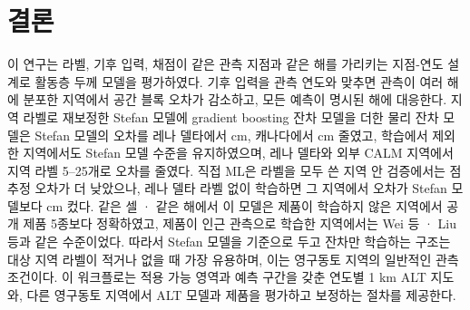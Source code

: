\section{결론}\label{sec:conclusions}
이 연구는 라벨, 기후 입력, 채점이 같은 관측 지점과 같은 해를 가리키는 지점-연도 설계로 활동층 두께 모델을 평가하였다. 기후 입력을 관측 연도와 맞추면 관측이 여러 해에 분포한 지역에서 공간 블록 오차가 감소하고, 모든 예측이 명시된 해에 대응한다. 지역 라벨로 재보정한 Stefan 모델에 gradient boosting 잔차 모델을 더한 물리 잔차 모델은 Stefan 모델의 오차를 레나 델타에서 \ndrefLeblkRoabs{} cm, 캐나다에서 \ndrefCablkRoabs{} cm 줄였고, 학습에서 제외한 지역에서도 Stefan 모델 수준을 유지하였으며, 레나 델타와 외부 CALM 지역에서 지역 라벨 5--25개로 오차를 줄였다. 직접 ML은 라벨을 모두 쓴 지역 안 검증에서는 점추정 오차가 더 낮았으나, 레나 델타 라벨 없이 학습하면 그 지역에서 오차가 Stefan 모델보다 \ndrefLeregDzabs{} cm 컸다. 같은 셀 · 같은 해에서 이 모델은 제품이 학습하지 않은 지역에서 공개 제품 5종보다 정확하였고, 제품이 인근 관측으로 학습한 지역에서는 Wei 등 · Liu 등과 같은 수준이었다. 따라서 Stefan 모델을 기준으로 두고 잔차만 학습하는 구조는 대상 지역 라벨이 적거나 없을 때 가장 유용하며, 이는 영구동토 지역의 일반적인 관측 조건이다. 이 워크플로는 적용 가능 영역과 예측 구간을 갖춘 연도별 1 km ALT 지도와, 다른 영구동토 지역에서 ALT 모델과 제품을 평가하고 보정하는 절차를 제공한다.
